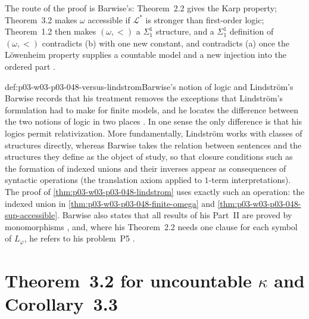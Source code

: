 The route of the proof is Barwise's: Theorem~2.2 gives the Karp property;
Theorem~3.2 makes \(\omega\) accessible if \(\mathcal L^{\ast}\) is stronger
than first-order logic; Theorem~1.2 then makes \((\omega,<)\) a
\(\Sigma^1_1\) structure, and a \(\Sigma^1_1\) definition of \((\omega,<)\)
contradicts (b) with one new constant, and contradicts (a) once the
L\"owenheim property supplies a countable model and a new injection into the
ordered part \cite[Part~II, \S3, proof of 3.4, p.~259]{Barwise1974Axioms}.

\begin{hbwarning}{def:p03-w03-p03-048-versus-lindstrom}{Barwise's notion of logic and Lindstr\"om's}
Barwise records that his treatment removes the exceptions that Lindstr\"om's
formulation had to make for finite models, and he locates the difference
between the two notions of logic in two places
\cite[Part~II, \S3, p.~259]{Barwise1974Axioms}.  In one sense the only
difference is that his logics permit relativization.  More fundamentally,
Lindstr\"om works with classes of structures directly, whereas Barwise takes
the relation between sentences and the structures they define as the object
of study, so that closure conditions such as the formation of indexed unions
and their inverses appear as consequences of syntactic operations (the
translation axiom applied to \(1\)-term interpretations).  The proof of
\cref{thm:p03-w03-p03-048-lindstrom} uses exactly such an operation: the
indexed union in \cref{thm:p03-w03-p03-048-finite-omega} and
\cref{thm:p03-w03-p03-048-sup-accessible}.  Barwise also states that all
results of his Part~II are proved by monomorphisms \cite[Part~I, \S5,
note~3, p.~232]{Barwise1974Axioms}, and, where his Theorem~2.2 needs one
clause for each symbol of \(L_\varphi\), he refers to his problem~P5
\cite[Part~II, \S2, p.~255]{Barwise1974Axioms}.
\end{hbwarning}

\section{Theorem~3.2 for uncountable \texorpdfstring{\(\kappa\)}{kappa} and Corollary~3.3}
\label{sec:p03-w03-p03-048-infinitary}

